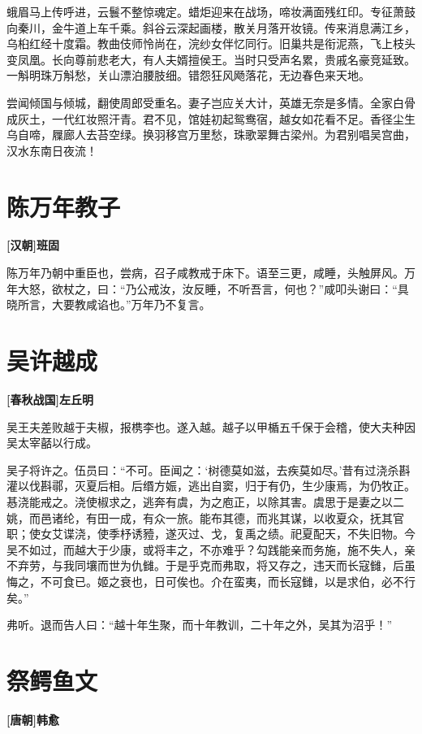 \documentclass[UTF8,titlepage,oneside]{ctexbook}
\begin{document}
蛾眉马上传呼进，云鬟不整惊魂定。蜡炬迎来在战场，啼妆满面残红印。专征萧鼓向秦川，金牛道上车千乘。斜谷云深起画楼，散关月落开妆镜。传来消息满江乡，乌桕红经十度霜。教曲伎师怜尚在，浣纱女伴忆同行。旧巢共是衔泥燕，飞上枝头变凤凰。长向尊前悲老大，有人夫婿擅侯王。当时只受声名累，贵戚名豪竞延致。一斛明珠万斛愁，关山漂泊腰肢细。错怨狂风飏落花，无边春色来天地。

尝闻倾国与倾城，翻使周郎受重名。妻子岂应关大计，英雄无奈是多情。全家白骨成灰土，一代红妆照汗青。君不见，馆娃初起鸳鸯宿，越女如花看不足。香径尘生乌自啼，屧廊人去苔空绿。换羽移宫万里愁，珠歌翠舞古梁州。为君别唱吴宫曲，汉水东南日夜流！


\chapter*{陈万年教子}
\begin{center}
	\textbf{[汉朝]班固}
\end{center}


陈万年乃朝中重臣也，尝病，召子咸教戒于床下。语至三更，咸睡，头触屏风。万年大怒，欲杖之，曰：“乃公戒汝，汝反睡，不听吾言，何也？”咸叩头谢曰：“具晓所言，大要教咸谄也。”万年乃不复言。

\chapter*{吴许越成}
\begin{center}
	\textbf{[春秋战国]左丘明}
\end{center}


吴王夫差败越于夫椒，报槜李也。遂入越。越子以甲楯五千保于会稽，使大夫种因吴太宰嚭以行成。


吴子将许之。伍员曰：“不可。臣闻之：‘树德莫如滋，去疾莫如尽。’昔有过浇杀斟灌以伐斟鄩，灭夏后相。后缗方娠，逃出自窦，归于有仍，生少康焉，为仍牧正。惎浇能戒之。浇使椒求之，逃奔有虞，为之庖正，以除其害。虞思于是妻之以二姚，而邑诸纶，有田一成，有众一旅。能布其德，而兆其谋，以收夏众，抚其官职；使女艾谍浇，使季杼诱豷，遂灭过、戈，复禹之绩。祀夏配天，不失旧物。今吴不如过，而越大于少康，或将丰之，不亦难乎？勾践能亲而务施，施不失人，亲不弃劳，与我同壤而世为仇雠。于是乎克而弗取，将又存之，违天而长寇雠，后虽悔之，不可食已。姬之衰也，日可俟也。介在蛮夷，而长寇雠，以是求伯，必不行矣。”


弗听。退而告人曰：“越十年生聚，而十年教训，二十年之外，吴其为沼乎！”



\chapter*{祭鳄鱼文}
\begin{center}
	\textbf{[唐朝]韩愈}
\end{center}
\end{document}
